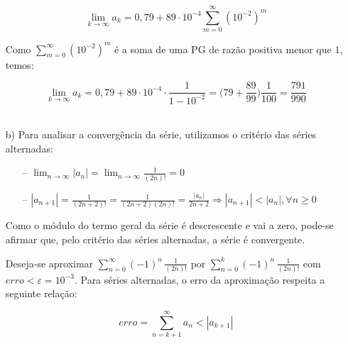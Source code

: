 \documentclass[12pt,a4paper]{article}
\begin{document}
\begin{itemize}
    $$ \lim_{k \rightarrow \infty} a_k = 0,79 + 89 \cdot 10^{-4} \sum_{m=0}^{\infty} (10^{-2})^m $$
    
    Como $\displaystyle\sum_{m=0}^{\infty} (10^{-2})^m$ é a soma de uma PG de razão positiva menor que $1$, temos:
    
    $$ \lim_{k \rightarrow \infty} a_k = 0,79 + 89 \cdot 10^{-4} \cdot \frac{1}{1 - 10^{-2}} = \Big(79 + \frac{89}{99} \Big) \frac{1}{100} = \frac{791}{990} $$ \\



    \item[b)] Para analisar a convergência da série, utilizamos o critério das séries alternadas:
    
    \begin{itemize}
    \item[--] $\lim_{n \rightarrow \infty} |a_n| = \lim_{n \rightarrow \infty} \displaystyle\frac{1}{(2n)!} = 0 $
    \item[--] $|a_{n+1}| = \displaystyle\frac{1}{(2n+2)!} = \displaystyle\frac{1}{(2n+2)(2n)!} = \frac{|a_n|}{2n+2} \Rightarrow |a_{n+1}| < |a_n|, \forall n \geq 0  $
    \end{itemize}
    
    Como o módulo do termo geral da série é descrescente e vai a zero, pode-se afirmar que, pelo critério das séries alternadas, a série é convergente.
    
    Deseja-se aproximar $\displaystyle\sum_{n=0}^\infty (-1)^n \, \frac{1}{(2n)!}$ por $\displaystyle\sum_{n=0}^k (-1)^n \, \frac{1}{(2n)!}$  com $erro < \varepsilon = 10^{-3}$.
Para séries alternadas, o erro da aproximação respeita a seguinte relação:

$$ erro = \sum_{n=k+1}^\infty a_n < |a_{k+1}| $$
    

\end{itemize}
\ \

\newpage

\end{document}
